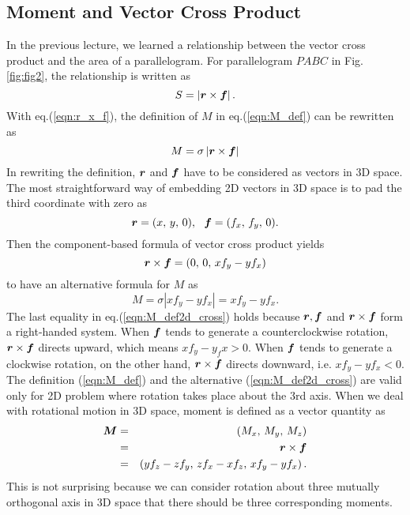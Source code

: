 \documentclass[10pt,a4j]{article}
\begin{document}
\subsection{Moment and Vector Cross Product}
In the previous lecture, we learned a relationship between the vector 
cross product and the area of a parallelogram. For parallelogram $PABC$ in 
Fig.\ref{fig:fig2}, the relationship is  written as 
\begin{equation}
	S=\left| \mbox{\boldmath $r$} \times \mbox{\boldmath $f$} \right|.
	\label{eqn:r_x_f}
\end{equation}
With eq.(\ref{eqn:r_x_f}), the definition of $M$ in eq.(\ref{eqn:M_def}) can be rewritten as 
\begin{equation}
	M=\sigma\left| \mbox{\boldmath $r$} \times \mbox{\boldmath $f$} \right|
	\label{eqn:M_def2}
\end{equation}
In rewriting the definition, $\mbox{\boldmath $r$}$ and $\mbox{\boldmath $f$}$ have to be considered as vectors 
in 3D space. The most straightforward way of embedding 2D vectors in 3D space is 
to pad the third coordinate with zero as 
\begin{equation}
	\fat{r}=(x,\, y,\, 0), \ \ 
	\fat{f}=(f_x,\, f_y,\,0).
	\label{eqn:}
\end{equation}
Then the component-based formula of vector cross product yields 
\begin{equation}
	\mbox{\boldmath $r$}\times \mbox{\boldmath $f$}=(0,\, 0,\, xf_y-yf_x)
\end{equation}
to have an alternative formula for $M$ as 
\begin{equation}
	M=\sigma \left| xf_y-yf_x \right| = xf_y-yf_x.
	\label{eqn:M_def2d_cross}
\end{equation}
The last equality in eq.(\ref{eqn:M_def2d_cross}) holds because 
$\mbox{\boldmath $r$}, \mbox{\boldmath $f$}$ and $\mbox{\boldmath $r$}\times\mbox{\boldmath $f$}$ form a right-handed system.
When $\mbox{\boldmath $f$}$ tends to generate a counterclockwise rotation, 
$\mbox{\boldmath $r$}\times\mbox{\boldmath $f$}$ directs upward, which means $xf_y-y_fx>0$.  
When $\mbox{\boldmath $f$}$ tends to generate a clockwise rotation,
on the other hand, $\mbox{\boldmath $r$}\times\mbox{\boldmath $f$}$ directs downward,
i.e. $xf_y-yf_x<0$.\\

The definition (\ref{eqn:M_def}) and the alternative (\ref{eqn:M_def2d_cross}) 
are valid only for 2D problem where rotation takes place about the 3rd axis. 
When we deal with rotational motion in 3D space, moment is defined as a vector 
quantity as 
\begin{eqnarray}
	\mbox{\boldmath $M$} &=& 
	(M_x,\, M_y,\, M_z) \nonumber \\
	&=&
	\mbox{\boldmath $r$}\times\mbox{\boldmath $f$} \nonumber \\
	&=&
	\left(
		yf_z-zf_y
	,\,
		zf_x-xf_z
	,\,
		xf_y-yf_x
	\right).
	\label{eqn:}
\end{eqnarray}
This is not surprising because we can consider rotation about 
three mutually orthogonal axis in 3D space that there should be 
three corresponding moments.
\end{document}
